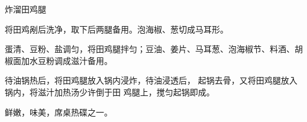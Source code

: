 \begin{recipe}{炸溜田鸡腿}

\ingredients


\cooking

\step 将田鸡剐后洗净，取下后两腿备用。泡海椒、葱切成马耳形。

\step 蛋清、豆粉、盐调匀，将田鸡腿拌匀；豆油、姜片、马耳葱、泡海椒节、料酒、胡椒面加水豆粉调成滋汁备用。

待油锅热后，将田鸡腿放入锅内浸炸，待油浸透后， 起锅去骨，又将田鸡腿放入锅内，将滋汁加热汤少许倒于田 鸡腿上，搅匀起锅即成。

\notes

鲜嫩，味美，席桌热碟之一。

\end{recipe}


